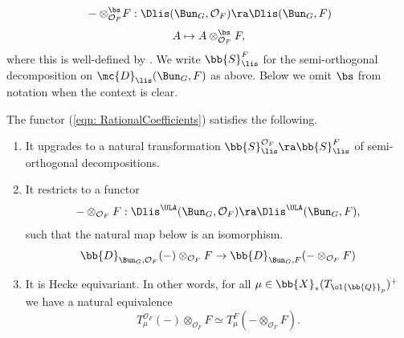 \documentclass[letterpaper,11pt]{amsart}
\begin{document}
\begin{equation}{\label{eqn: RationalCoefficients}}
- \otimes^{\bs}_{\mathcal{O}_{F}} F: \Dlis(\Bun_{G},\mathcal{O}_{F}) \ra \Dlis(\Bun_{G},F)
\end{equation}
\[ A \mapsto A \otimes^{\bs}_{\mathcal{O}_{F}} F,\]
where this is well-defined by \cite[Proposition~VII.6.2]{FSGeomLLC}. We write $\bb{S}_{\lis}^{F}$ for the semi-orthogonal decomposition on $\mc{D}_{\lis}(\Bun_{G},F)$ as above. Below we omit $\bs$ from notation when the context is clear.
\begin{lemma}{\label{lemma: RationalCoefficients}}
The functor (\ref{eqn: RationalCoefficients}) satisfies the following.
\begin{enumerate}
\item It upgrades to a natural transformation $\bb{S}_{\lis}^{\mathcal{O}_{F}} \ra \bb{S}_{\lis}^{F}$ of semi-orthogonal decompositions.
\item It restricts to a functor 
\[ - \otimes_{\mathcal{O}_{F}} F: \Dlis^{\ULA}(\Bun_{G},\mathcal{O}_{F}) \ra \Dlis^{\ULA}(\Bun_{G},F), \]
such that the natural map below is an isomorphism.
\[  \bb{D}_{\Bun_{G},\mathcal{O}_{F}}(-) \otimes_{\mathcal{O}_{F}} F\to \bb{D}_{\Bun_{G},F}(- \otimes_{\mathcal{O}_{F}} F)\]

\item It is Hecke equivariant. In other words, for all $\mu \in \bb{X}_{*}(T_{\ol{\bb{Q}}_{p}})^{+}$ we have a natural equivalence
\[ T_{\mu}^{\mathcal{O}_{F}}(-) \otimes_{\mathcal{O}_{F}} F \simeq T_{\mu}^{F}(- \otimes_{\mathcal{O}_{F}} F). \]
\end{enumerate}
\end{lemma}
\end{document}
